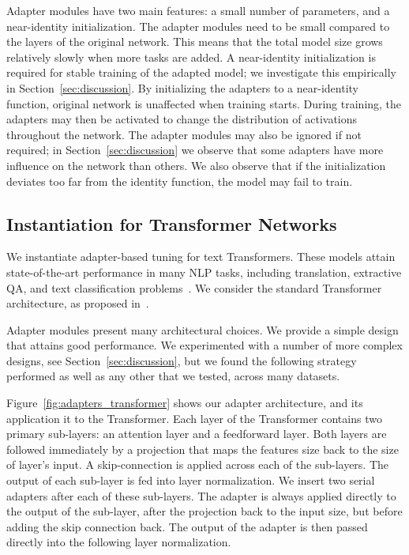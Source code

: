 Adapter modules have two main features: a small number of parameters, and a near-identity initialization. The adapter modules need to be small compared to the layers of the original network. This means that the total model size grows relatively slowly when more tasks are added. A near-identity initialization is required for stable training of the adapted model; we investigate this empirically in Section~\ref{sec:discussion}.
By initializing the adapters to a near-identity function, original network is unaffected when training starts. During training, the adapters may then be activated to change the distribution of activations throughout the network. The adapter modules may also be ignored if not required; in Section~\ref{sec:discussion} we observe that some adapters have more influence on the network than others. We also observe that if the initialization deviates too far from the identity function, the model may fail to train.

\subsection{Instantiation for Transformer Networks\label{sec:bottleneckadapter}}

We instantiate adapter-based tuning for text Transformers. These models attain state-of-the-art performance in many NLP tasks, including translation, extractive QA, and text classification problems~\citep{vaswani2017,radford2018improving,devlin2018bert}. We consider the standard Transformer architecture, as proposed in~\citet{vaswani2017}.

Adapter modules present many architectural choices. We provide a simple design that attains good performance. We experimented with a number of more complex designs, see Section~\ref{sec:discussion},
but we found the following strategy performed as well as any other that we tested, across many datasets.

Figure~\ref{fig:adapters_transformer} shows our adapter architecture, and its application it to the Transformer. Each layer of the Transformer contains two primary sub-layers: an attention layer and a feedforward layer. Both layers are followed immediately by a projection that maps the features size back to the size of layer's input. A skip-connection is applied across each of the sub-layers. The output of each sub-layer is fed into layer normalization. We insert two serial adapters after each of these sub-layers. The adapter is always applied directly to the output of the sub-layer, after the projection back to the input size, but before adding the skip connection back. The output of the adapter is then passed directly into the following layer normalization.

